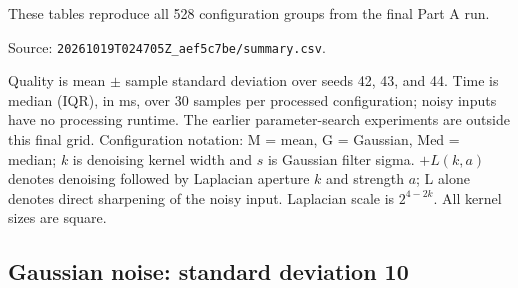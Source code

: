 These tables reproduce all 528 configuration groups from the final Part A run.\par
Source: \texttt{20261019T024705Z\_aef5c7be/summary.csv}.\par Quality is mean $\pm$ sample standard deviation over seeds 42, 43, and 44. Time is median (IQR), in ms, over 30 samples per processed configuration; noisy inputs have no processing runtime. The earlier parameter-search experiments are outside this final grid.
Configuration notation: M = mean, G = Gaussian, Med = median; $k$ is denoising kernel width and $s$ is Gaussian filter sigma. $+L(k,a)$ denotes denoising followed by Laplacian aperture $k$ and strength $a$; L alone denotes direct sharpening of the noisy input. Laplacian scale is $2^{4-2k}$. All kernel sizes are square.
\subsection{Gaussian noise: standard deviation 10}
\begingroup
\footnotesize
\setlength{\tabcolsep}{4pt}
